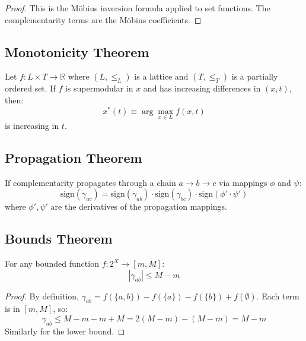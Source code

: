 \begin{proof}
This is the Möbius inversion formula applied to set functions. The complementarity terms are the Möbius coefficients.
\end{proof}

\subsection{Monotonicity Theorem}

\begin{theorem}
\label{thm:topkis}
Let $f: L \times T \to \mathbb{R}$ where $(L, \leq_L)$ is a lattice and $(T, \leq_T)$ is a partially ordered set. If $f$ is supermodular in $x$ and has increasing differences in $(x, t)$, then:
\begin{equation}
x^*(t) \equiv \arg\max_{x \in L} f(x, t)
\end{equation}
is increasing in $t$.
\end{theorem}

\subsection{Propagation Theorem}

\begin{theorem}
\label{thm:sign-propagation}
If complementarity propagates through a chain $a \to b \to c$ via mappings $\phi$ and $\psi$:
\begin{equation}
\text{sign}(\gamma_{ac}) = \text{sign}(\gamma_{ab}) \cdot \text{sign}(\gamma_{bc}) \cdot \text{sign}(\phi' \cdot \psi')
\end{equation}
where $\phi', \psi'$ are the derivatives of the propagation mappings.
\end{theorem}

\subsection{Bounds Theorem}

\begin{theorem}
\label{thm:bounds}
For any bounded function $f: 2^X \to [m, M]$:
\begin{equation}
|\gamma_{ab}| \leq M - m
\end{equation}
\end{theorem}

\begin{proof}
By definition, $\gamma_{ab} = f(\{a,b\}) - f(\{a\}) - f(\{b\}) + f(\emptyset)$. Each term is in $[m, M]$, so:
\begin{equation}
\gamma_{ab} \leq M - m - m + M = 2(M-m) - (M-m) = M - m
\end{equation}
Similarly for the lower bound.
\end{proof}

